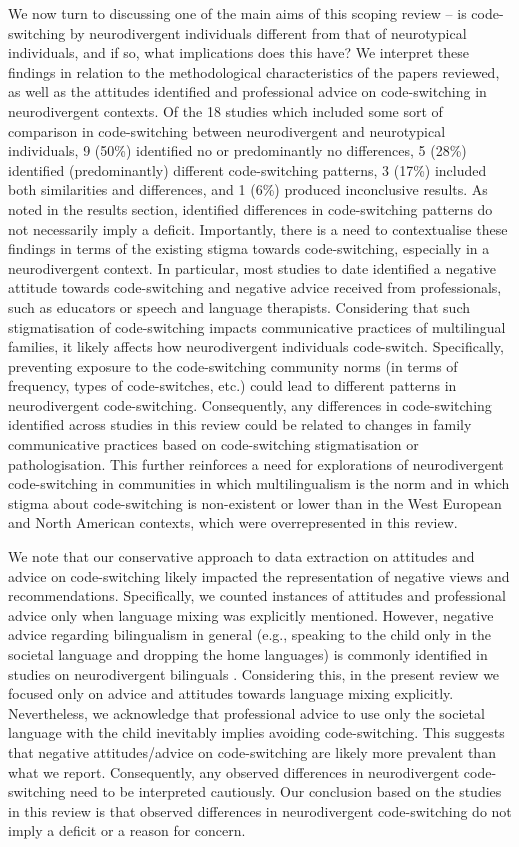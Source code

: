 \documentclass[output=paper]{langscibook}
\begin{document}
We now turn to discussing one of the main aims of this scoping review -- is code-switching by neurodivergent individuals different from that of neurotypical individuals, and if so, what implications does this have? We interpret these findings in relation to the methodological characteristics of the papers reviewed, as well as the attitudes identified and professional advice on code-switching in neurodivergent contexts. Of the 18 studies which included some sort of comparison in code-switching between neurodivergent and neurotypical individuals, 9 (50\%) identified no or predominantly no differences, 5 (28\%) identified (predominantly) different code-switching patterns, 3 (17\%) included both similarities and differences, and 1 (6\%) produced inconclusive results. As noted in the results section, identified differences in code-switching patterns do not necessarily imply a deficit. Importantly, there is a need to contextualise these findings in terms of the existing stigma towards code-switching, especially in a neurodivergent context. In particular, most studies to date identified a negative attitude towards code-switching and negative advice received from professionals, such as educators or speech and language therapists. Considering that such stigmatisation of code-switching impacts communicative practices of multilingual families, it likely affects how neurodivergent individuals code-switch. Specifically, preventing exposure to the code-switching community norms (in terms of frequency, types of code-switches, etc.) could lead to different patterns in neurodivergent code-switching. Consequently, any differences in code-switching identified across studies in this review could be related to changes in family communicative practices based on code-switching stigmatisation or pathologisation. This further reinforces a need for explorations of neurodivergent code-switching in communities in which multilingualism is the norm and in which stigma about code-switching is non-existent or lower than in the West European and North American contexts, which were overrepresented in this review.

We note that our conservative approach to data extraction on attitudes and advice on code-switching likely impacted the representation of negative views and recommendations. Specifically, we counted instances of attitudes and professional advice only when language mixing was explicitly mentioned. However, negative advice regarding bilingualism in general (e.g., speaking to the child only in the societal language and dropping the home languages) is commonly identified in studies on neurodivergent bilinguals \citep{UljarevićEtAl2016}. Considering this, in the present review we focused only on advice and attitudes towards language mixing explicitly. Nevertheless, we acknowledge that professional advice to use only the societal language with the child inevitably implies avoiding code-switching. This suggests that negative attitudes/advice on code-switching are likely more prevalent than what we report. Consequently, any observed differences in neurodivergent code-switching need to be interpreted cautiously. Our conclusion based on the studies in this review is that observed differences in neurodivergent code-switching do not imply a deficit or a reason for concern.
\end{document}
